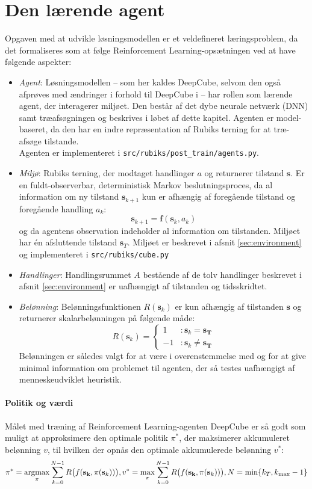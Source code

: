 \documentclass[../main.tex]{subfiles}
\begin{document}
\section{Den lærende agent}\label{sec:learnADI}
Opgaven med at udvikle løsningsmodellen er et veldefineret læringsproblem, da det formaliseres som at følge Reinforcement Learning-opsætningen ved at have følgende aspekter:
\begin{itemize}
	\item \textit{Agent}: Løsningsmodellen -- som her kaldes DeepCube, selvom den også afprøves med ændringer i forhold til DeepCube i \cite{HumansBeGone} -- har rollen som lærende agent, der interagerer miljøet. Den består af det dybe neurale netværk (DNN) samt træafsøgningen og beskrives i løbet af dette kapitel. Agenten er model-baseret, da den har en indre repræsentation af Rubiks terning for at træ-afsøge tilstande.  \\
	Agenten er implementeret i  \texttt{src/rubiks/post\_train/agents.py}.
	\item \textit{Miljø}: Rubiks terning, der modtaget handlinger \(a\) og returnerer tilstand \(\mathbf s\). Er en fuldt-observerbar, deterministisk Markov beslutningsproces, da al information om ny tilstand \(\mathbf s_{k+1}\) kun er afhængig af foregående tilstand og foregående handling \(a_k\):
	\[
		\mathbf s _ {k+1} = \mathbf f(\mathbf s _k, a_k)
	\] 
	og da agentens observation indeholder al information om tilstanden. Miljøet har én afsluttende tilstand \(\mathbf s_T\). Miljøet er  beskrevet i afsnit \ref{sec:environment} og implementeret i \texttt{src/rubiks/cube.py} 
	\item  \textit{Handlinger}: Handlingsrummet \(A\) bestående af de tolv handlinger beskrevet i afsnit \ref{sec:environment} er uafhængigt af tilstanden og tidsskridtet.
	\item \textit{Belønning}: Belønningsfunktionen \( R(\mathbf s_k)\) er kun afhængig af tilstanden \(\mathbf s\) og returnerer skalarbelønningen på følgende måde:
	\[
		R (\mathbf s_k) = 
		\begin{cases}
			1  &: \mathbf s_k = \mathbf{s_T}\\
			-1 &: \mathbf s_k \neq \mathbf{s_T}
		\end{cases}
	\] 
	Belønningen er således valgt for at være i overenstemmelse med \cite{HumansBeGone} og for at give minimal information om problemet til agenten, der så testes uafhængigt af menneskeudviklet heuristik.
\end{itemize}
\paragraph{Politik og værdi} Målet med træning af Reinforcement Learning-agenten DeepCube er så godt som muligt at approksimere den optimale politik \(\pi^*\), der maksimerer akkumuleret belønning \(v\), til hvilken der opnås den optimale akkumulerede belønning \(v^*\):
\begin{equation}\label{eq:maximization}
\pi^* = \operatorname*{argmax}_{\pi}\sum_{k=0}^{N-1} R\big(f(\mathbf{s_k},\pi(\mathbf s_k))\big),
v^* = \operatorname*{max}_\pi\sum_{k=0}^{N-1} R\big(f(\mathbf{s_k},\pi(\mathbf s_k))\big),
N = \operatorname{min}\{k_T, k_{\text{max}}-1\}
\end{equation}
\end{document}
